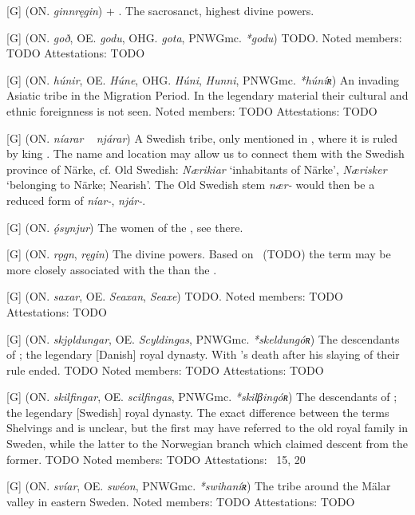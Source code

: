 \begin{itemize}
[G] (ON. \emph{ginnręgin})
   + . The sacrosanct, highest divine powers.

[G] (ON. \emph{goð}, OE. \emph{godu}, OHG. \emph{gota}, PNWGmc. \emph{*godu})
  TODO.
  Noted members: TODO
  Attestations: TODO

[G] (ON. \emph{húnir}, OE. \emph{Húne}, OHG. \emph{Húni}, \emph{Hunni}, PNWGmc. \emph{*húníʀ})
  An invading Asiatic tribe in the Migration Period. In the legendary material their cultural and ethnic foreignness is not seen.
  Noted members: TODO
  Attestations: TODO

[G] (ON. \emph{níarar} ~ \emph{njárar})
  A Swedish tribe, only mentioned in \Volundarkvida, where it is ruled by king . The name and location may allow us to connect them with the Swedish province of Närke, cf. Old Swedish: \emph{Nærikiar} ‘inhabitants of Närke’, \emph{Nærisker} ‘belonging to Närke; Nearish’. The Old Swedish stem \emph{nær-} would then be a reduced form of \emph{níar-}, \emph{njár-}.

[G] (ON. \emph{ǫ́synjur})
  The women of the , see there.

[G] (ON. \emph{rǫgn}, \emph{ręgin})
  The divine powers. Based on \Vafthrudnismal\ (TODO) the term may be more closely associated with the  than the .

[G] (ON. \emph{saxar}, OE. \emph{Seaxan}, \emph{Seaxe})
  TODO.
  Noted members: TODO
  Attestations: TODO

[G] (ON. \emph{skjǫldungar}, OE. \emph{Scyldingas}, PNWGmc. \emph{*skeldungóʀ})
  The descendants of ; the legendary [Danish] royal dynasty. With 's death after his slaying of  their rule ended. TODO
  Noted members: TODO
  Attestations: TODO

[G] (ON. \emph{skilfingar}, OE. \emph{scilfingas}, PNWGmc. \emph{*skilβingóʀ})
  The descendants of ; the legendary [Swedish] royal dynasty. The exact difference between the terms Shelvings and  is unclear, but the first may have referred to the old royal family in Sweden, while the latter to the Norwegian branch which claimed descent from the former. TODO
  Noted members: TODO
  Attestations: \Hyndluljod\ 15, 20

[G] (ON. \emph{svíar}, OE. \emph{swéon}, PNWGmc. \emph{*swihaníʀ})
  The tribe around the Mälar valley in eastern Sweden.
  Noted members: TODO
  Attestations: TODO


\end{itemize}

